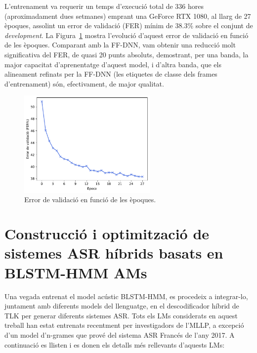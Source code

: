 L'entrenament va requerir un temps d'execució total de 336 hores (aproximadament dues setmanes) emprant una GeForce RTX 1080, al llarg de 27 èpoques, assolint un error de validació (FER) mínim de 38.3\% sobre el conjunt de \textit{development}. La Figura~\ref{fig:wer_per_epoch} mostra l'evolució d'aquest error de validació en funció de les èpoques.
Comparant amb la FF-DNN, vam obtenir una reducció molt significativa del FER, de quasi 20 punts absoluts, demostrant, per una banda, la major capacitat d'aprenentatge d'aquest model, i d'altra banda, que els alineament refinats per la FF-DNN (les etiquetes de classe dels frames d'entrenament) són, efectivament, de major qualitat.

\begin{figure}[ht!]
    \centering
    \includegraphics[width=0.6\textwidth]{figuras/validation_error.pdf}
    \caption{Error de validació en funció de les èpoques.}
    \label{fig:wer_per_epoch}
\end{figure}


\section{Construcció i optimització de sistemes ASR híbrids basats en BLSTM-HMM AMs}
\label{cap05_decod}
Una vegada entrenat el model acústic BLSTM-HMM, es procedeix a integrar-lo, juntament amb diferents models del llenguatge, en el descodificador híbrid de TLK per generar diferents sistemes ASR. Tots els LMs considerats en aquest treball han estat entrenats recentment per investigadors de l'MLLP, a excepció d'un model d'n-grames que prové del sistema ASR Francés de l'any 2017. A continuació es llisten i es donen els detalls més rellevants d'aquests LMs:

